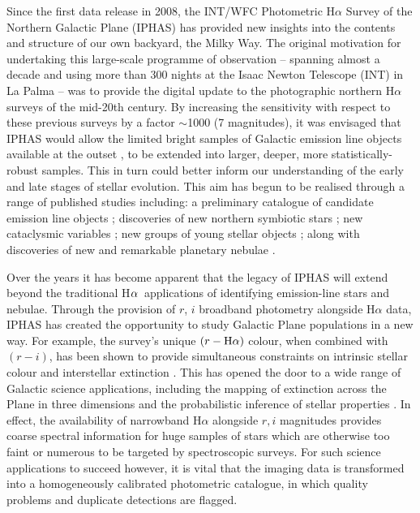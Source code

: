 \documentclass[useAMS,usenatbib]{mn2e}
\def\ha{\mbox{H$\rm \alpha$}}
\begin{document}
Since the first data release in 2008, 
the INT/WFC Photometric H$\alpha$ Survey 
of the Northern Galactic Plane (IPHAS)
has provided new insights into the contents and structure 
of our own backyard, the Milky Way. 
The original motivation for undertaking 
this large-scale programme of observation
-- spanning almost a decade 
and using more than 300 nights 
at the Isaac Newton Telescope (INT) in La Palma -- 
was to provide the digital update 
to the photographic northern H$\alpha$ surveys 
of the mid-20th century. 
By increasing the sensitivity 
with respect to these previous surveys 
by a factor $\sim$1000 (7 magnitudes), 
it was envisaged that IPHAS would allow 
the limited bright samples of Galactic emission line objects 
available at the outset \citep[e.g.][]{Kohoutek1999}, 
to be extended into larger, deeper, more statistically-robust samples.
This in turn could better inform our understanding 
of the early and late stages of stellar evolution. 
This aim has begun to be realised through a
range of published studies including: 
a preliminary catalogue of candidate emission line objects \citep{Witham2008};
discoveries of new northern symbiotic stars \citep{Corradi2008, Corradi2010}; 
new cataclysmic variables \citep{Witham2007}; 
new groups of young stellar objects \citep{Vink2008,Barentsen2011a};
along with discoveries of new and remarkable planetary nebulae 
\citep{Mampaso2006, Corradi2011, Viironen2011}.

Over the years it has become apparent that the legacy of IPHAS 
will extend beyond the traditional \ha\ applications 
of identifying emission-line stars and nebulae. 
Through the provision of $r$, $i$ broadband photometry 
alongside H$\alpha$ data,
IPHAS has created the opportunity 
to study Galactic Plane populations 
in a new way.
For example, the survey’s unique $(r-\ha)$ colour, 
when combined with $(r-i)$,
has been shown to provide simultaneous constraints 
on intrinsic stellar colour and interstellar extinction \citep{Drew2008}. 
This has opened the door 
to a wide range of Galactic science applications, 
including the mapping of extinction across the Plane in three dimensions
and the probabilistic inference of stellar properties
\citep{Sale2009, Sale2010, Giammanco2011, Sale2012, Barentsen2013}. 
In effect, the availability of narrowband H$\alpha$ 
alongside $r, i$ magnitudes
provides coarse spectral information for huge samples of stars 
which are otherwise too faint or numerous 
to be targeted by spectroscopic surveys.
For such science applications to succeed however, 
it is vital that the imaging data is transformed 
into a homogeneously calibrated photometric catalogue, 
in which quality problems 
and duplicate detections are flagged. 
\end{document}
